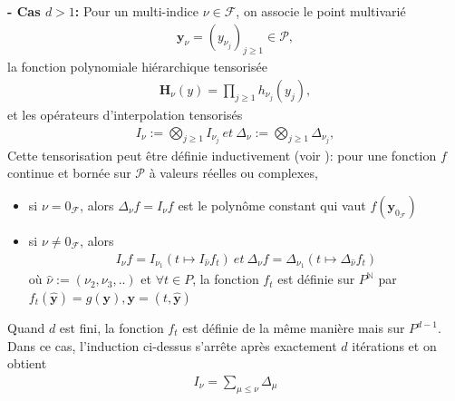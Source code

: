\hspace{0.5cm}
\textbf{ - Cas $d>1$: }
Pour un multi-indice $\nu \in \mathcal{F}$, on associe le point multivarié
\begin{align}
		\textbf{y}_{\nu} = (y_{\nu_j})_{j \geq 1} \in \mathcal{P}, \nonumber
\end{align}
la fonction polynomiale hiérarchique tensorisée
\begin{align}
		\textbf{H}_{\nu}(y) = \prod_{ j \geq 1} h_{\nu_j} (y_j), \nonumber
\end{align}
et les opérateurs d'interpolation tensorisés
\begin{align}
		I_{\nu} := \bigotimes_{j \geq 1} I_{\nu_j}\ et\ \Delta_{\nu} := \bigotimes_{j \geq 1} \Delta_{\nu_j}, \nonumber
\end{align}
Cette tensorisation peut être définie inductivement (voir \cite{Albert}): pour une fonction $f$ continue et bornée sur $\mathcal{P}$ à valeurs réelles ou complexes,
\begin{itemize}
		\item si $\nu=0_{\mathcal{F}}$, alors $\Delta_{\nu}f = I_{\nu}f$ est le polynôme constant qui vaut $f(\textbf{y}_{0_{\mathcal{F}}})$
		\item si $\nu \neq 0_{\mathcal{F}}$, alors
		\begin{align}
				I_{\nu}f = I_{\nu_1} (t \mapsto I_{\hat{\nu}}f_t)\ et\ \Delta_{\nu}f = \Delta_{\nu_1} (t \mapsto \Delta_{\hat{\nu}}f_t) \nonumber
		\end{align}
		où $\hat{\nu} := (\nu_2, \nu_3, ..)$ et $\forall t \in P$, la fonction $f_t$ est définie sur $P^{\mathbb{N}}$ par $f_t(\hat{\mathbf{y}}) = g(\mathbf{y}),\mathbf{y}=(t,\hat{\mathbf{y}})$
\end{itemize}
Quand $d$ est fini, la fonction $f_t$ est définie de la même manière mais sur $P^{d-1}$. Dans ce cas, l'induction ci-dessus s'arrête après exactement $d$ itérations et on obtient
\begin{align}
		I_{\nu} = \sum_{\mu \leq \nu} \Delta_{\mu} \nonumber
\end{align}

\vspace{0.5cm}



